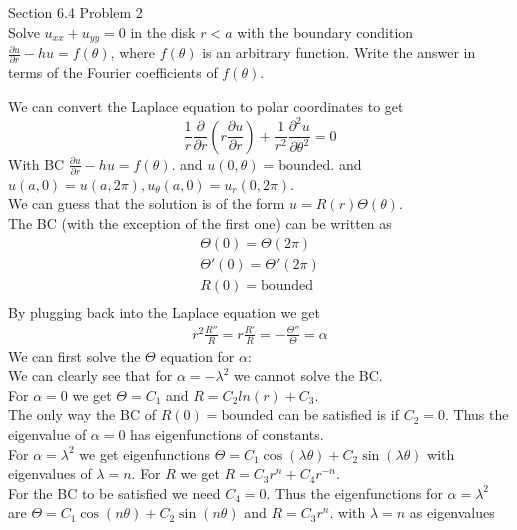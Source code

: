 \documentclass[answers,12pt,addpoints]{exam}
\begin{document}
\begin{questions}
    \question Section 6.4 Problem 2\\
    Solve \( u_{xx} + u_{yy} = 0 \) in the disk \( r < a \) with the boundary condition \( \frac{\partial u}{\partial r} - hu = f(\theta) \), where \( f(\theta) \) is an arbitrary function. Write the answer in terms of the Fourier coefficients of \( f(\theta) \).
    \begin{solution}
        We can convert the Laplace equation to polar coordinates to get
        $$\frac{1}{r} \frac{\partial}{\partial r} \left( r \frac{\partial u}{\partial r} \right) + \frac{1}{r^2} \frac{\partial^2 u}{\partial \theta^2} = 0$$
        With BC $\frac{\partial u}{\partial r} - hu = f(\theta)$. and $u(0, \theta) = \text{bounded}$. and $u(a, 0) = u(a, 2\pi), u_\theta(a,0) = u_r(0,2\pi)$.\\
        We can guess that the solution is of the form $u = R(r) \Theta(\theta)$. \\
        The BC (with the exception of the first one) can be written as
        \begin{align*}
            \Theta(0) = \Theta(2\pi) \\
            \Theta'(0) = \Theta'(2\pi) \\
            R(0) = \text{bounded} \\
        \end{align*}
        By plugging back into the Laplace equation we get
        \begin{align*}
            r^2\frac{R''}{R} = r \frac{R'}{R} = -\frac{\Theta''}{\Theta} = \alpha
        \end{align*}
        We can first solve the $\Theta$ equation for $\alpha$:\\
        We can clearly see that for $\alpha = -\lambda^2$ we cannot solve the BC. \\
        For $\alpha = 0$ we get $\Theta = C_1$ and $R = C_2 ln(r) + C_3$. \\
        The only way the BC of $R(0) = \text{bounded}$ can be satisfied is if $C_2 = 0$. Thus the eigenvalue of $\alpha = 0$ has eigenfunctions of constants. \\
        For $\alpha = \lambda^2$ we get eigenfunctions $\Theta = C_1 \cos(\lambda \theta) + C_2 \sin(\lambda \theta)$ with eigenvalues of $\lambda = n$. For $R$ we get $R = C_3 r^n + C_4 r^{-n}$. \\
        For the BC to be satisfied we need $C_4 = 0$. Thus the eigenfunctions for $\alpha = \lambda^2$ are $\Theta = C_1 \cos(n\theta) + C_2 \sin(n\theta) $ and $R = C_3 r^n$. with $\lambda = n$ as eigenvalues\\\\

\end{solution}
\end{questions}
\end{document}
